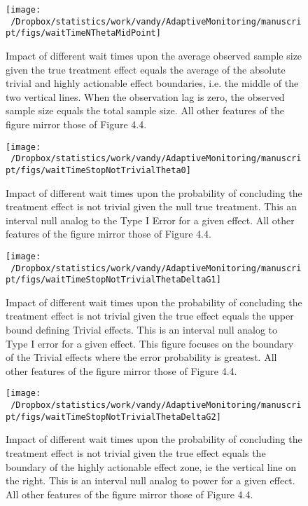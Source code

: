 \documentclass[12pt,oneside]{book}
\newlength{\li}\setlength{\li}{14.48pt}
\newlength{\di}\setlength{\di}{-3.5mm}
\theoremstyle{definition}
\theoremstyle{definition}
\theoremstyle{definition}
\theoremstyle{remark}
\begin{document}
\begin{figure}[H]

{\centering \texttt{[image: ~/Dropbox/statistics/work/vandy/AdaptiveMonitoring/manuscript/figs/waitTimeNThetaMidPoint]} 

}

\caption{Impact of different wait times upon the average observed sample size given the true treatment effect equals the average of the absolute trivial and highly actionable effect boundaries, i.e. the middle of the two vertical lines. When the observation lag is zero, the observed sample size equals the total sample size. All other features of the figure mirror those of Figure 4.4.}\label{fig:n}
\end{figure}

\begin{figure}[H]

{\centering \texttt{[image: ~/Dropbox/statistics/work/vandy/AdaptiveMonitoring/manuscript/figs/waitTimeStopNotTrivialTheta0]} 

}

\caption{Impact of different wait times upon the probability of concluding the treatment effect is not trivial given the null true treatment.  This an interval null analog to the Type I Error for a given effect. All other features of the figure mirror those of Figure 4.4.}\label{fig:powInterval}
\end{figure}

\begin{figure}[H]

{\centering \texttt{[image: ~/Dropbox/statistics/work/vandy/AdaptiveMonitoring/manuscript/figs/waitTimeStopNotTrivialThetaDeltaG1]} 

}

\caption{Impact of different wait times upon the probability of concluding the treatment effect is not trivial given the true effect equals the upper bound defining Trivial effects. This is an interval null analog to Type I error for a given effect.  This figure focuses on the boundary of the Trivial effects where the error probability is greatest. All other features of the figure mirror those of Figure 4.4. }\label{fig:typeiTrivial}
\end{figure}

\begin{figure}[H]

{\centering \texttt{[image: ~/Dropbox/statistics/work/vandy/AdaptiveMonitoring/manuscript/figs/waitTimeStopNotTrivialThetaDeltaG2]} 

}

\caption{Impact of different wait times upon the probability of concluding the treatment effect is not trivial given the true effect equals the boundary of the highly actionable effect zone, ie the vertical line on the right. This is an interval null analog to power for a given effect. All other features of the figure mirror those of Figure 4.4.}\label{fig:typeii}
\end{figure}
\end{document}
